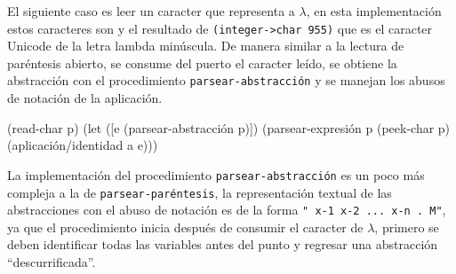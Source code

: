 \documentclass[letterpaper,twoside,openright,10pt]{book}
\begin{document}
El siguiente caso es leer un caracter que representa a \( λ \), en esta implementación estos caracteres son {\tt{}{}{}{}} y el resultado de {\tt{}(integer->char\ 955)} que es el caracter Unicode de la letra lambda minúscula. De manera similar a la lectura de paréntesis abierto, se consume del puerto el caracter leído, se obtiene la abstracción con el procedimiento {\tt{}parsear-\protect{}abstracción\protect{}} y se manejan los abusos de notación de la aplicación.

\nwenddocs{}\endmoddef
(read-char p)
(let ([e (parsear-abstracción p)])
  (parsear-expresión p (peek-char p) (aplicación/identidad a e)))
\nwendcode{}\nwdocspar

La implementación del procedimiento {\tt{}parsear-\protect{}abstracción\protect{}} es un poco más compleja a la de {\tt{}\protect{}parsear-paréntesis}, la representación textual de las abstracciones con el abuso de notación es de la forma {\tt{}"{}\ x-1\ x-2\ ...\ x-n\ .\ M"}, ya que el procedimiento inicia después de consumir el caracter de \( λ \), primero se deben identificar todas las variables antes del punto y regresar una abstracción ``descurrificada''.
\end{document}
